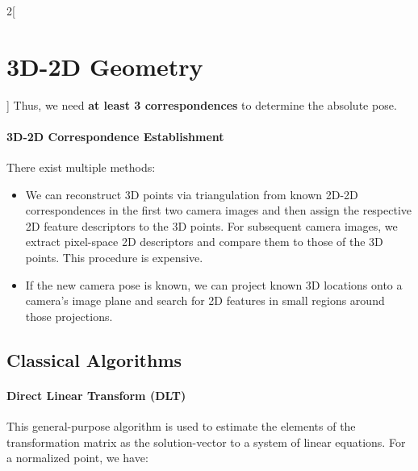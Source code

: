 \documentclass[oneside,fontsize=11pt,paper=a4]{scrartcl}
\begin{document}
\begin{multicols}{2}[\section{3D-2D Geometry}]
Thus, we need \textbf{at least 3 correspondences} to determine the absolute pose. 

\paragraph{3D-2D Correspondence Establishment} There exist multiple methods:
\begin{itemize}
    \item We can reconstruct 3D points via triangulation from known 2D-2D correspondences in the first two camera images and then assign the respective 2D feature descriptors to the 3D points. For subsequent camera images, we extract pixel-space 2D descriptors and compare them to those of the 3D points. This procedure is expensive.
    \item If the new camera pose is known, we can project known 3D locations onto a camera's image plane and search for 2D features in small regions around those projections.
\end{itemize}
    
\subsection{Classical Algorithms}

\paragraph{Direct Linear Transform (DLT)} This general-purpose algorithm is used to estimate the elements of the transformation matrix as the solution-vector to a system of linear equations. For a normalized point, we have:


\end{multicols}
\end{document}
